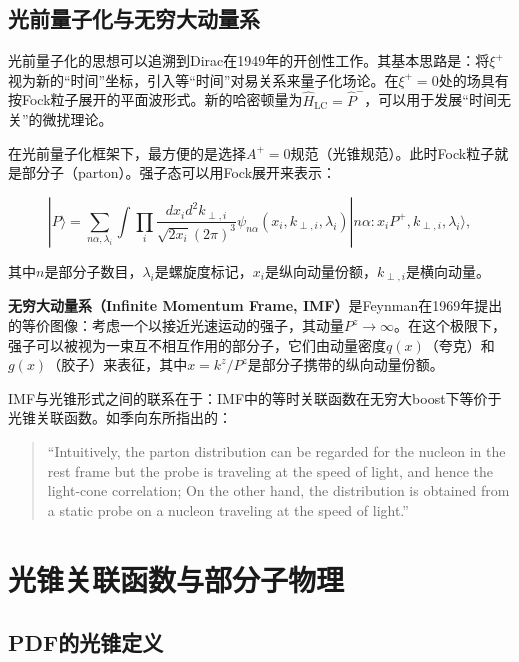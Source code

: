 \documentclass[12pt,a4paper]{ctexart}
\theoremstyle{definition}
\begin{document}
\subsection{光前量子化与无穷大动量系}

光前量子化的思想可以追溯到Dirac在1949年的开创性工作\cite{Ji2014LaMET}。其基本思路是：将$\xi^+$视为新的``时间''坐标，引入等``时间''对易关系来量子化场论。在$\xi^+ = 0$处的场具有按Fock粒子展开的平面波形式。新的哈密顿量为$\hat{H}_{\text{LC}} = \hat{P}^-$，可以用于发展``时间无关''的微扰理论。

在光前量子化框架下，最方便的是选择$A^+ = 0$规范（光锥规范）。此时Fock粒子就是部分子（parton）。强子态可以用Fock展开来表示\cite{Ji2014LaMET}：

\begin{equation}
|P\rangle = \sum_{n\alpha,\lambda_i} \int \prod_i \frac{dx_i d^2k_{\perp,i}}{\sqrt{2x_i}(2\pi)^3} \psi_{n\alpha}(x_i, k_{\perp,i}, \lambda_i) |n\alpha: x_i P^+, k_{\perp,i}, \lambda_i\rangle,
\label{eq:Fock_expansion}
\end{equation}

其中$n$是部分子数目，$\lambda_i$是螺旋度标记，$x_i$是纵向动量份额，$k_{\perp,i}$是横向动量。

\textbf{无穷大动量系（Infinite Momentum Frame, IMF）}是Feynman在1969年提出的等价图像\cite{Ji2014LaMET}：考虑一个以接近光速运动的强子，其动量$P^z \to \infty$。在这个极限下，强子可以被视为一束互不相互作用的部分子，它们由动量密度$q(x)$（夸克）和$g(x)$（胶子）来表征，其中$x = k^z/P^z$是部分子携带的纵向动量份额。

IMF与光锥形式之间的联系在于：IMF中的等时关联函数在无穷大boost下等价于光锥关联函数\cite{Ji2013Euclidean, Ji2014LaMET}。如季向东所指出的\cite{Ji2013Euclidean}：

\begin{quote}
``Intuitively, the parton distribution can be regarded for the nucleon in the rest frame but the probe is traveling at the speed of light, and hence the light-cone correlation; On the other hand, the distribution is obtained from a static probe on a nucleon traveling at the speed of light.''
\end{quote}

\section{光锥关联函数与部分子物理}

\subsection{PDF的光锥定义}
\end{document}
